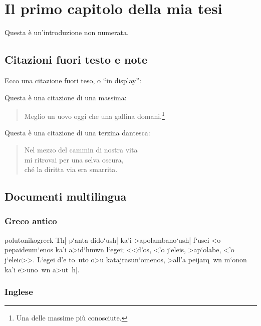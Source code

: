 \chapter{Il primo capitolo della mia tesi}

\chapterintro

Questa è un'introduzione non numerata.


\section{Citazioni fuori testo e note}

Ecco una citazione fuori teso, o ``in display'':
\begin{quotation}
\lipsum[11]
\end{quotation}

Questa è una citazione di una massima:
\begin{quote}
Meglio un uovo oggi che una gallina domani.\footnote{Una delle massime più conosciute.}
\end{quote}

Questa è una citazione di una terzina dantesca:
\begin{verse}
Nel mezzo del cammin di nostra vita\\
mi ritrovai per una selva oscura,\\
ché la diritta via era smarrita.
\end{verse}


\section{Documenti multilingua}

\subsection{Greco antico}

   \begin{otherlanguage*}{polutonikogreek}
Th| p`anta dido`ush|
ka'i >apolambano`ush| f`usei
<o pepaideum`enos ka'i
a>id`hmwn l`egei; <<d'os, <'o
j`eleis, >ap`olabe, <'o
j`eleic>>. L`egei d'e to~uto
o>u katajrasun`omenos, >all'a
peijarq~wn m`onon ka'i
e>uno~wn a>ut~h|.
   \end{otherlanguage*}
   
 \subsection{Inglese}
 
